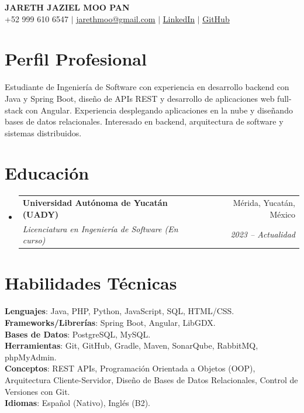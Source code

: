 \documentclass[letterpaper,12pt]{article}
\makeatletter
\newcommand{\resumeSubheading}[4]{
  \vspace{-2pt}\item
    \begin{tabular*}{0.97\textwidth}[t]{l@{\extracolsep{\fill}}r}
      \textbf{#1} & #2 \\
      \textit{\small#3} & \textit{\small #4} \\
    \end{tabular*}\vspace{-7pt}
}
\newcommand{\resumeSubHeadingListStart}{\begin{itemize}[leftmargin=0.15in, label={}]}
\newcommand{\resumeSubHeadingListEnd}{\end{itemize}}
\newcommand{\cvlink}[2]{\href{#1}{\underline{#2}}}
\makeatother
\begin{document}
\begin{center}
    \textbf{\Huge \scshape JARETH JAZIEL MOO PAN} \\ \vspace{5pt}
    \small +52 999 610 6547 $|$ 
    \cvlink{mailto:jarethmoo@gmail.com}{jarethmoo@gmail.com} $|$ 
    \cvlink{https://linkedin.com/in/jareth-moo-6b8500271}{LinkedIn} $|$
    \cvlink{https://github.com/JarethJaziel}{GitHub}
\end{center}

\section{Perfil Profesional}
Estudiante de Ingeniería de Software con experiencia en desarrollo backend con Java y Spring Boot, diseño de APIs REST y desarrollo de aplicaciones web full-stack con Angular. Experiencia desplegando aplicaciones en la nube y diseñando bases de datos relacionales. Interesado en backend, arquitectura de software y sistemas distribuidos.
\section{Educación}
  \resumeSubHeadingListStart
    \resumeSubheading
      {Universidad Autónoma de Yucatán (UADY)}{Mérida, Yucatán, México}
      {Licenciatura en Ingeniería de Software (En curso)}{2023 -- Actualidad}
  \resumeSubHeadingListEnd

\section{Habilidades Técnicas}
 \begin{itemize}[leftmargin=0.15in, label={}]
    \small{\item{
     \textbf{Lenguajes}{: Java, PHP, Python, JavaScript, SQL, HTML/CSS.}\\
     \textbf{Frameworks/Librerías}{: Spring Boot, Angular, LibGDX.}\\
     \textbf{Bases de Datos}{: PostgreSQL, MySQL.}\\
     \textbf{Herramientas}{: Git, GitHub, Gradle, Maven, SonarQube, RabbitMQ, phpMyAdmin.}\\
     \textbf{Conceptos}{: REST APIs, Programación Orientada a Objetos (OOP),
     Arquitectura Cliente-Servidor, Diseño de Bases de Datos Relacionales,
     Control de Versiones con Git.}\\
     \textbf{Idiomas}{: Español (Nativo), Inglés (B2).}
    }}
 \end{itemize}
\end{document}
